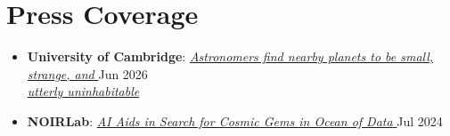 \documentclass[a4paper,10pt]{article}
\begin{document}
\section*{Press Coverage}

\begin{itemize}
  \item \textbf{University of Cambridge}:
    \href{https://www.cam.ac.uk/research/news/astronomers-find-nearby-planets-to-be-small-strange-and-utterly-uninhabitable}{
      \textit{Astronomers find nearby planets to be small, strange, and}
    } \hfill Jun 2026\\
    \href{https://www.ast.cam.ac.uk/news/astronomers-find-nearby-planets-be-small-strange-and-utterly-uninhabitable}{
      \textit{utterly uninhabitable}
    }

  \item \textbf{NOIRLab}:
    \href{https://noirlab.edu/public/blog/cosmic-gems/}{
      \textit{AI Aids in Search for Cosmic Gems in Ocean of Data}
    }
    \hfill Jul 2024
\end{itemize}
\end{document}
